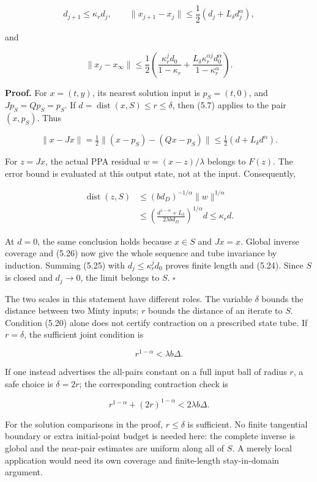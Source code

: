 \documentclass[11pt,a4paper]{article}
\theoremstyle{plain}
\theoremstyle{definition}
\theoremstyle{remark}
\begin{document}
\[
d_{j+1}\le\kappa_r d_j,
\qquad
\|x_{j+1}-x_j\|\le\frac12(d_j+L_\delta d_j^\alpha),
\tag{5.23}
\]

and

\[
\|x_j-x_\infty\|
\le\frac12\left(
\frac{\kappa_r^j d_0}{1-\kappa_r}
+\frac{L_\delta\kappa_r^{\alpha j}d_0^\alpha}
{1-\kappa_r^\alpha}
\right).
\tag{5.24}
\]

\textbf{Proof.} For \(x=(t,y)\), its nearest solution input is
\(p_S=(t,0)\), and \(Jp_S=Qp_S=p_S\). If
\(d=\operatorname{dist}(x,S)\le r\le\delta\), then (5.7) applies to the
pair \((x,p_S)\). Thus

\[
\|x-Jx\|
=\tfrac12\|(x-p_S)-(Qx-p_S)\|
\le\tfrac12(d+L_\delta d^\alpha).
\tag{5.25}
\]

For \(z=Jx\), the actual PPA residual \(w=(x-z)/\lambda\) belongs to
\(F(z)\). The error bound is evaluated at this output state, not at the
input. Consequently,

\[
\begin{aligned}
\operatorname{dist}(z,S)
&\le (bd_D)^{-1/\alpha}\|w\|^{1/\alpha}\\
&\le\left(\frac{d^{1-\alpha}+L_\delta}{2\lambda bd_D}\right)^{1/\alpha}d
\le\kappa_r d.
\end{aligned}
\tag{5.26}
\]

At \(d=0\), the same conclusion holds because \(x\in S\) and \(Jx=x\).
Global inverse coverage and (5.26) now give the whole sequence and tube
invariance by induction. Summing (5.25) with \(d_j\le\kappa_r^j d_0\)
proves finite length and (5.24). Since \(S\) is closed and \(d_j\to0\),
the limit belongs to \(S\). \(\square\)

The two scales in this statement have different roles. The variable
\(\delta\) bounds the distance between two Minty inputs; \(r\) bounds
the distance of an iterate to \(S\). Condition (5.20) alone does not
certify contraction on a prescribed state tube. If \(r=\delta\), the
sufficient joint condition is

\[
r^{1-\alpha}<\lambda b\Delta.
\tag{5.27}
\]

If one instead advertises the all-pairs constant on a full input ball of
radius \(r\), a safe choice is \(\delta=2r\); the corresponding
contraction check is

\[
r^{1-\alpha}+(2r)^{1-\alpha}<2\lambda b\Delta.
\tag{5.28}
\]

For the solution comparisons in the proof, \(r\le\delta\) is sufficient.
No finite tangential boundary or extra initial-point budget is needed
here: the complete inverse is global and the near-pair estimates are
uniform along all of \(S\). A merely local application would need its
own coverage and finite-length stay-in-domain argument.
\end{document}
